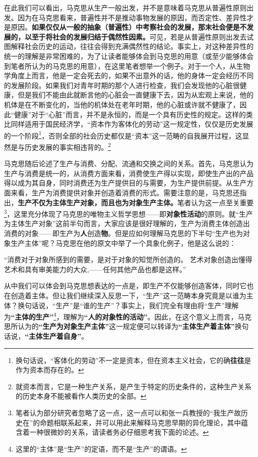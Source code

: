 \documentclass[a4paper,twoside,12pt]{ctexart}
\begin{document}
在此我们可以看出，马克思从生产一般出发，并不是意味着马克思从普遍性原则出发。因为在马克思看来，普遍性并不是推动事物发展的原因，而否定性、差异性才是原因。\textbf{如果仅仅从一般的抽象（普遍性）中考察社会的发展，那末社会便是不发展的，以至于将社会的发展归结于偶然性因素。}可见，若是从普遍性原则出发去试图解释社会历史的运动，往往会得到充满偶然性的结论。事实上，对这种差异性的统一的理解是非常困难的，为了让读者能够体会到马克思的用意（或至少能够体会到笔者所认为的马克思的用意），在这里笔者想举一个例子。对于一个人，从生物学角度上而言，他是一定会死去的，如果不出意外的话，他的身体一定会经历不同的发展阶段。如果我们对青年时期的那个人进行检查，我们会发现他的心脏很健康，但是我们不能由此就断言他的心脏会一直健康下去，因为从宏观上来说，他的机体是在不断变化的，当他的机体处在老年时期，他的心脏或许就不健康了，因此“健康”对于“心脏”而言，并不是永恒的，而是一个具有历史性的规定。这样的类比同样适用于国民经济学，“资本作为客体化的劳动”这一规定性，仅仅是历史发展的一个阶段\footnote{换句话说，“客体化的劳动”不一定是资本，但在资本主义社会，它的确\textbf{往往}是作为资本而存在的。}，否则全部的社会历史都仅是“资本”这一范畴的自我展开过程，这显然是与历史发展的事实相违背的。\footnote{就资本而言，它是一种生产关系，是产生于特定的历史条件的，这种生产关系的历史本身不能被看作人类历史的全部。}

马克思随后论述了生产与消费、分配、流通和交换之间的关系。首先，马克思认为生产与消费是统一的，从消费方面来看，消费使生产得以实现，即使生产出的产品得以成为其自身，同时消费还为生产提供目的与需要，为生产提供前提。从生产方面来看，生产为消费提供对象并创造着消费的形式。需要注意的是，马克思还指出，\textbf{生产不仅为主体生产对象，而且也为对象生产主体。}笔者认为这一点至关重要\footnote{笔者认为部分研究者忽略了这一点，这一点可以和张一兵教授的“我生产故历史在”的命题相联系起来，并可以用此来解释马克思早期的异化理论，其中蕴含着一种很微妙的关系，请读者务必仔细思考我下面的论述。}，这里充分体现了马克思的唯物主义哲学思想——即\textbf{对象性活动}的原则。就“生产为主体生产对象”这前半句而言，大家应该是很好理解的，生产为消费主体创造出消费的对象——即生产为\textbf{人}创造\textbf{物}。但是应如何理解马克思的下半句“生产也为对象生产主体”呢？马克思在他的原文中举了一个具象化例子，他是这么说的：

\begin{fangsong}
“消费对于对象所感到的需要，是对于对象的知觉所创造的。 艺术对象创造出懂得艺术和具有审美能力的大众,——任何其他产品也都是这样。”
\end{fangsong}

从中我们可以体会到马克思想表达的一点是，即生产不仅能够创造客体，同时它也在创造着主体。但让我们继续深入反思一下，“生产”这一范畴本身究竟是以谁为主体？换句话说，“生产”是“谁的生产”？事实上，我们完全有理由将“生产”理解为\textbf{“主体的生产”}\footnote{这里的“主体”是“生产”的定语，而不是“生产”的谓语。}，理解为\textbf{“人的对象性的活动”}。因此，在这个意义上而言，马克思所认为的\textbf{“生产为对象生产主体”}这一规定便可以转译为\textbf{“主体生产着主体”}换句话说，\textbf{“主体生产着自身”}。
\end{document}
